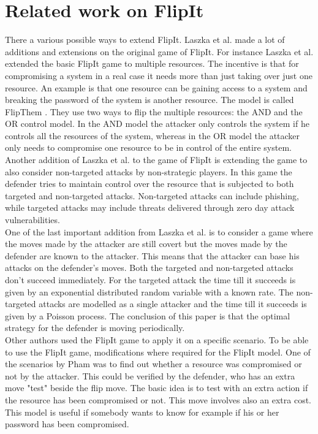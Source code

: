 \documentclass[journal,a4paper]{IEEEtran}
\begin{document}
\section{Related work on FlipIt}
\label{ch:extendedWork}

There a various possible ways to extend FlipIt. 
Laszka et al. made a lot of additions and extensions on the original game of FlipIt. For instance Laszka et al. extended the basic FlipIt game to multiple resources. The incentive is that for compromising a system in a real case it needs more than just taking over just one resource. An example is that one resource can be gaining access to a system and breaking the password of the system is another resource. The model is called FlipThem \cite{FlipThem}
. They use two ways to flip the multiple resources: the AND and the OR control model. In the AND model the attacker only controls the system if he controls all the resources of the system, whereas in the OR model the attacker only needs to compromise one resource to be in control of the entire system. \\

Another addition of Laszka et al. to the game of FlipIt \cite{MitigationCovert} 
is extending the game to also consider non-targeted attacks by non-strategic players. In this game the defender tries to maintain control over the resource that is subjected to both targeted and non-targeted attacks. Non-targeted attacks can include phishing, while targeted attacks may include threats delivered through zero day attack vulnerabilities. \\
One of the last important addition from Laszka et al. \cite{MitigationNonTargeted} is to consider a game where the moves made by the attacker are still covert but the moves made by the defender are known to the attacker. This means that the attacker can base his attacks on the defender's moves. Both the targeted and non-targeted attacks don't succeed immediately. For the targeted attack the time till it succeeds is given by an exponential distributed random variable with a known rate. The non-targeted attacks are modelled as a single attacker and the time till it succeeds is given by a Poisson process. The conclusion of this paper is that the optimal strategy for the defender is moving periodically. \\ 

Other authors used the FlipIt game to apply it on a specific scenario. To be able to use the FlipIt game, modifications where required for the FlipIt model.
One of the scenarios by Pham \cite{compromised} was to find out whether a resource was compromised or not by the attacker. This could be verified by the defender, who has an extra move "test" beside the flip move. The basic idea is to test with an extra action if the resource has been compromised or not. This move involves also an extra cost. This model is useful if somebody wants to know for example if his or her password has been compromised.   \\
\end{document}
